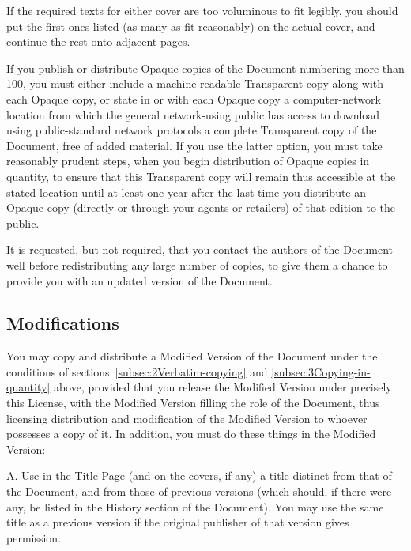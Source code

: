 {\tiny{}If the required texts for either cover are too voluminous
to fit legibly, you should put the first ones listed (as many as fit
reasonably) on the actual cover, and continue the rest onto adjacent
pages.}{\tiny\par}

{\tiny{}If you publish or distribute Opaque copies of the Document
numbering more than 100, you must either include a machine-readable
Transparent copy along with each Opaque copy, or state in or with
each Opaque copy a computer-network location from which the general
network-using public has access to download using public-standard
network protocols a complete Transparent copy of the Document, free
of added material. If you use the latter option, you must take reasonably
prudent steps, when you begin distribution of Opaque copies in quantity,
to ensure that this Transparent copy will remain thus accessible at
the stated location until at least one year after the last time you
distribute an Opaque copy (directly or through your agents or retailers)
of that edition to the public.}{\tiny\par}

{\tiny{}It is requested, but not required, that you contact the authors
of the Document well before redistributing any large number of copies,
to give them a chance to provide you with an updated version of the
Document.}{\tiny\par}

\subsection{Modifications\label{subsec:4Modifications}}

{\tiny{}You may copy and distribute a Modified Version of the Document
under the conditions of sections~\ref{subsec:2Verbatim-copying}
and \ref{subsec:3Copying-in-quantity} above, provided that you release
the Modified Version under precisely this License, with the Modified
Version filling the role of the Document, thus licensing distribution
and modification of the Modified Version to whoever possesses a copy
of it. In addition, you must do these things in the Modified Version:}{\tiny\par}

{\tiny{}A. Use in the Title Page (and on the covers, if any) a title
distinct from that of the Document, and from those of previous versions
(which should, if there were any, be listed in the History section
of the Document). You may use the same title as a previous version
if the original publisher of that version gives permission.}{\tiny\par}


